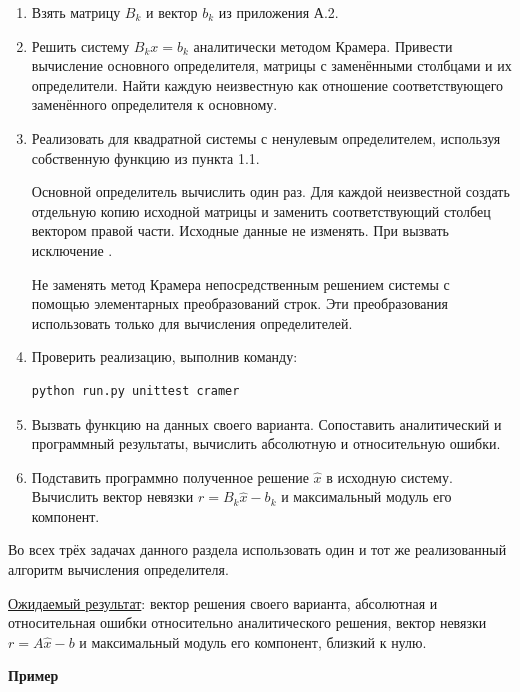 \documentclass[12pt,a4paper]{article}
\newcommand{\taskhead}[1]{\par\textbf{#1}\par}
\begin{document}
\begin{enumerate}
  \item Взять матрицу $B_k$ и вектор $b_k$ из приложения А.2.
  \item Решить систему $B_kx=b_k$ аналитически методом Крамера.
  Привести вычисление основного определителя, матрицы
  с заменёнными столбцами и их определители.
  Найти каждую неизвестную как отношение соответствующего
  заменённого определителя к основному.
  
  \newpage
  
  \item Реализовать  для квадратной системы
  с ненулевым определителем, используя собственную функцию
   из пункта 1.1.

  Основной определитель вычислить один раз.
  Для каждой неизвестной создать отдельную копию исходной
  матрицы и заменить соответствующий столбец вектором
  правой части. Исходные данные не изменять.
  При  вызвать
  исключение .

  Не заменять метод Крамера непосредственным решением
  системы с помощью элементарных преобразований строк.
  Эти преобразования использовать только для вычисления
  определителей.
  \item Проверить реализацию, выполнив команду:
  \begin{lstlisting}[style=commands]
  python run.py unittest cramer\end{lstlisting}
  \item Вызвать функцию на данных своего варианта.
  Сопоставить аналитический и программный результаты,
  вычислить абсолютную и относительную ошибки.
  \item Подставить программно полученное решение $\widehat{x}$
  в исходную систему. Вычислить вектор невязки
  $r=B_k\widehat{x}-b_k$ и максимальный модуль его компонент.
\end{enumerate}

Во всех трёх задачах данного раздела использовать один и тот же
реализованный алгоритм вычисления определителя.

\underline{Ожидаемый результат}: вектор решения своего варианта, абсолютная и относительная ошибки
относительно аналитического решения, вектор невязки $r=A\widehat x-b$
и максимальный модуль его компонент, близкий к нулю.

\taskhead{Пример}
\end{document}
